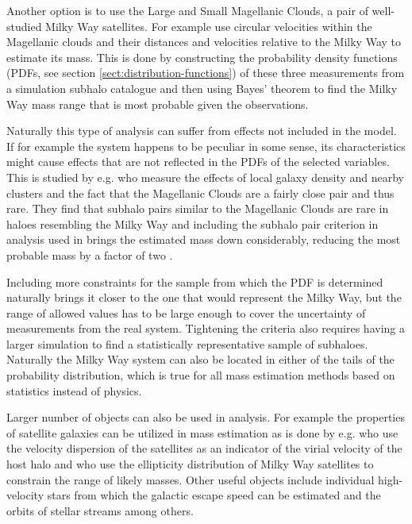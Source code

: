 \documentclass[english, twoside]{HYgradu}
\begin{document}
Another option is to use the Large and Small Magellanic Clouds, a pair of well-studied Milky Way satellites. For example \citet{busha2011mass} use circular velocities within the Magellanic clouds and their distances and velocities relative to the Milky Way to estimate its mass. This is done by constructing the probability density functions (PDFs, see section \ref{sect:distribution-functions}) of these three measurements from a simulation subhalo catalogue and then using Bayes' theorem to find the Milky Way mass range that is most probable given the observations.

Naturally this type of analysis can suffer from effects not included in the model. If for example the system happens to be peculiar in some sense, its characteristics might cause effects that are not reflected in the PDFs of the selected variables. This is studied by e.g. \citet{gonzalez2013satellites} who measure the effects of local galaxy density and nearby clusters and the fact that the Magellanic Clouds are a fairly close pair and thus rare. They find that subhalo pairs similar to the Magellanic Clouds are rare in haloes resembling the Milky Way and including the subhalo pair criterion in analysis used in \citet{busha2011mass} brings the estimated mass down considerably, reducing the most probable mass by a factor of two \citep{gonzalez2013satellites}.

Including more constraints for the sample from which the PDF is determined naturally brings it closer to the one that would represent the Milky Way, but the range of allowed values has to be large enough to cover the uncertainty of measurements from the real system. Tightening the criteria also requires having a larger simulation to find a statistically representative sample of subhaloes. Naturally the Milky Way system can also be located in either of the tails of the probability distribution, which is true for all mass estimation methods based on statistics instead of physics.

Larger number of objects can also be used in analysis. For example the properties of satellite galaxies can be utilized in mass estimation as is done by e.g. \citet{sales2007satellites} who use the velocity dispersion of the satellites as an indicator of the virial velocity of the host halo and \citet{barber2013orbital} who use the ellipticity distribution of Milky Way satellites to constrain the range of likely masses. Other useful objects include individual high-velocity stars from which the galactic escape speed can be estimated \citep{piffl2014rave} and the orbits of stellar streams \citep{newberg2010orbit} among others.
\end{document}
